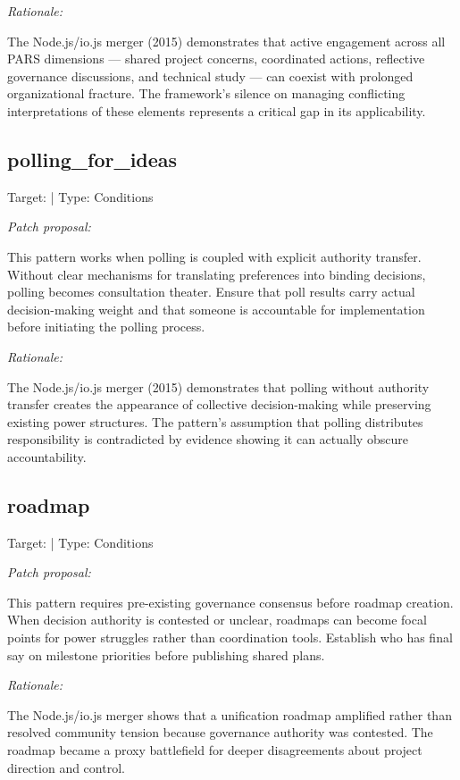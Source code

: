 \documentclass[11pt,a4paper]{article}
\begin{document}
\textit{Rationale:}

The Node.js/io.js merger (2015) demonstrates that active engagement across all PARS dimensions — shared project concerns, coordinated actions, reflective governance discussions, and technical study — can coexist with prolonged organizational fracture. The framework's silence on managing conflicting interpretations of these elements represents a critical gap in its applicability.

\subsection{polling\_for\_ideas}
Target: \texttt{} | Type: Conditions

\textit{Patch proposal:}

This pattern works when polling is coupled with explicit authority transfer. Without clear mechanisms for translating preferences into binding decisions, polling becomes consultation theater. Ensure that poll results carry actual decision-making weight and that someone is accountable for implementation before initiating the polling process.

\textit{Rationale:}

The Node.js/io.js merger (2015) demonstrates that polling without authority transfer creates the appearance of collective decision-making while preserving existing power structures. The pattern's assumption that polling distributes responsibility is contradicted by evidence showing it can actually obscure accountability.

\subsection{roadmap}
Target: \texttt{} | Type: Conditions

\textit{Patch proposal:}

This pattern requires pre-existing governance consensus before roadmap creation. When decision authority is contested or unclear, roadmaps can become focal points for power struggles rather than coordination tools. Establish who has final say on milestone priorities before publishing shared plans.

\textit{Rationale:}

The Node.js/io.js merger shows that a unification roadmap amplified rather than resolved community tension because governance authority was contested. The roadmap became a proxy battlefield for deeper disagreements about project direction and control.
\end{document}
